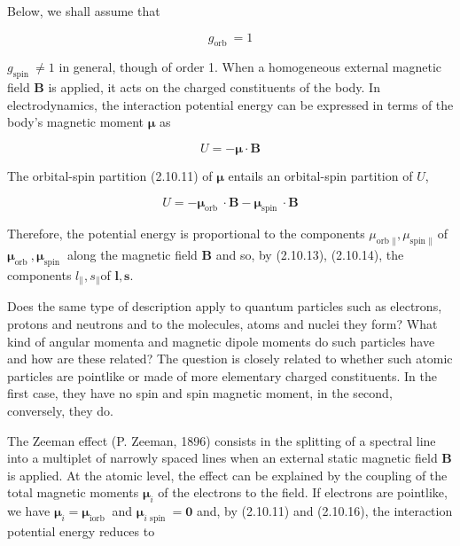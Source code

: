 \documentclass{article}
\begin{document}
Below, we shall assume that
 
\begin{equation*}
g_{\text {orb }}=1 \tag{2.10.15}
\end{equation*}
 
$g_{\text {spin }} \neq 1$ in general, though of order 1.
When a homogeneous external magnetic field $\boldsymbol{B}$ is applied, it acts on the charged constituents of the body. In electrodynamics, the interaction potential energy can be expressed in terms of the body's magnetic moment $\boldsymbol{\mu}$ as
 
\begin{equation*}
U=-\boldsymbol{\mu} \cdot \boldsymbol{B} \tag{2.10.16}
\end{equation*}
 

The orbital-spin partition (2.10.11) of $\boldsymbol{\mu}$ entails an orbital-spin partition of $U$,
 
\begin{equation*}
U=-\boldsymbol{\mu}_{\text {orb }} \cdot \boldsymbol{B}-\boldsymbol{\mu}_{\text {spin }} \cdot \boldsymbol{B} \tag{2.10.17}
\end{equation*}
 

Therefore, the potential energy is proportional to the components $\mu_{\text {orb } \|}, \mu_{\text {spin } \|}$ of $\boldsymbol{\mu}_{\text {orb }}, \boldsymbol{\mu}_{\text {spin }}$ along the magnetic field $\boldsymbol{B}$ and so, by (2.10.13), (2.10.14), the components $l_{\|}, s_{\|}$of $\boldsymbol{l}, \boldsymbol{s}$.

Does the same type of description apply to quantum particles such as electrons, protons and neutrons and to the molecules, atoms and nuclei they form? What kind of angular momenta and magnetic dipole moments do such particles have and how are these related? The question is closely related to whether such atomic particles are pointlike or made of more elementary charged constituents. In the first case, they have no spin and spin magnetic moment, in the second, conversely, they do.

The Zeeman effect (P. Zeeman, 1896) consists in the splitting of a spectral line into a multiplet of narrowly spaced lines when an external static magnetic field $\boldsymbol{B}$ is applied. At the atomic level, the effect can be explained by the coupling of the total magnetic moments $\boldsymbol{\mu}_{i}$ of the electrons to the field. If electrons are pointlike, we have $\boldsymbol{\mu}_{i}=\boldsymbol{\mu}_{\text {iorb }}$ and $\boldsymbol{\mu}_{i \text { spin }}=\mathbf{0}$ and, by (2.10.11) and (2.10.16), the interaction potential energy reduces to
 
\end{document}
